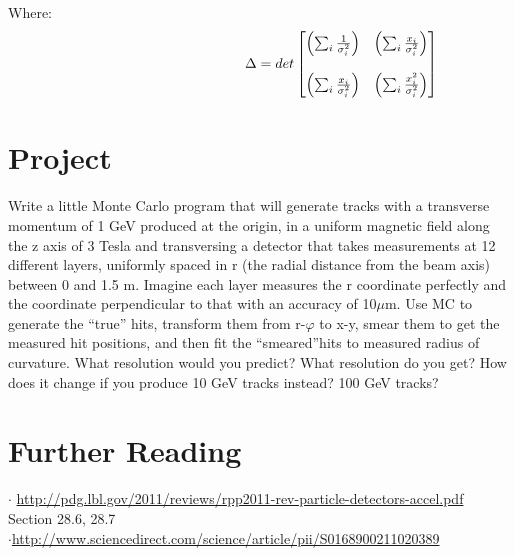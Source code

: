\noindent
Where: 
\begin{equation}\hspace{41mm}
\Delta=det\begin{bmatrix}
\left(\sum_{i}\frac{1}{\sigma_{i}^{2}} \right )&\left(\sum_{i}\frac{x_{i}}{\sigma_{i}^{2}} \right)\\ \\
\left(\sum_{i}\frac{x_{i}}{\sigma_{i}^{2}} \right)&\left(\sum_{i}\frac{x_{i}^{2}}{\sigma_{i}^{2}}\right)
\end{bmatrix}
\end{equation}

\section{Project}
Write a little Monte Carlo program that will generate tracks with a transverse momentum of 1 GeV produced at the origin, in a uniform magnetic field along the z axis of 3 Tesla and transversing a detector that takes measurements at 12 different layers, uniformly spaced in r (the radial distance from the beam axis) between 0 and 1.5 m. Imagine each layer measures the r coordinate perfectly and the coordinate perpendicular to that with an accuracy of 10$\mu$m. Use MC to generate the ``true'' hits, transform them from r-$\varphi$ to x-y, smear them to get the measured hit positions, and then fit the ``smeared''hits to measured radius of curvature. What resolution would you predict?  What resolution do you get?  How does it change if you produce 10 GeV tracks instead? 100 GeV tracks?
\section{Further Reading}
$\cdot$ \url{http://pdg.lbl.gov/2011/reviews/rpp2011-rev-particle-detectors-accel.pdf} Section 28.6, 28.7\\
\noindent
$\cdot$\url{http://www.sciencedirect.com/science/article/pii/S0168900211020389}



















